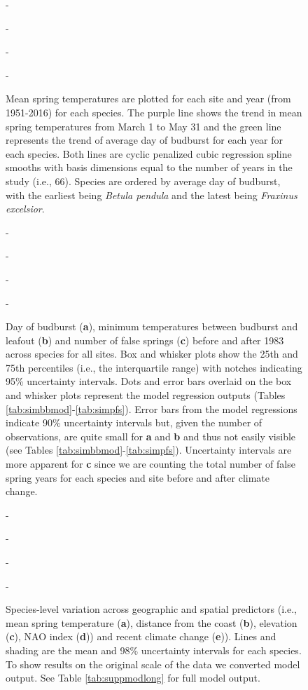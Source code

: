 \documentclass{article}\usepackage[]{graphicx}\usepackage[]{color}
\begin{document}
{\begin{figure} [H]
  -\begin{center}
  -\caption{Mean spring temperatures are plotted for each site and year (from 1951-2016) for each species. The purple line shows the trend in mean spring temperatures from March 1 to May 31 and the green line represents the trend of average day of budburst for each year for each species. Both lines are cyclic penalized cubic regression spline smooths with basis dimensions equal to the number of years in the study (i.e., 66). Species are ordered by average day of budburst, with the earliest being \textit{Betula pendula} and the latest being \textit{Fraxinus excelsior}. }\label{fig:mst}
  -\end{center}
  -\end{figure}}
  
{\begin{figure} [H]
  -\begin{center}
  -\caption{Day of budburst (\textbf{a}), minimum temperatures between budburst and leafout (\textbf{b}) and number of false springs (\textbf{c}) before and after 1983 across species for all sites. Box and whisker plots show the 25th and 75th percentiles (i.e., the interquartile range) with notches indicating 95\% uncertainty intervals. Dots and error bars overlaid on the box and whisker plots represent the model regression outputs (Tables \ref{tab:simbbmod}-\ref{tab:simpfs}). Error bars from the model regressions indicate 90\% uncertainty intervals but, given the number of observations, are quite small for \textbf{a} and \textbf{b} and thus not easily visible (see Tables \ref{tab:simbbmod}-\ref{tab:simpfs}). Uncertainty intervals are more apparent for \textbf{c} since we are counting the total number of false spring years for each species and site before and after climate change.  }\label{fig:boxfs}
  -\end{center}
  -\end{figure}}

  
{\begin{figure} [H]
  -\begin{center}
  -\caption{Species-level variation across geographic and spatial predictors (i.e., mean spring temperature (\textbf{a}), distance from the coast (\textbf{b}), elevation (\textbf{c}), NAO index (\textbf{d})) and recent climate change (\textbf{e})). Lines and shading are the mean and 98\% uncertainty intervals for each species. To show results on the original scale of the data we converted model output. See Table \ref{tab:suppmodlong} for full model output. }\label{fig:spp}
  -\end{center}
  -\end{figure}}


  
\end{document}
